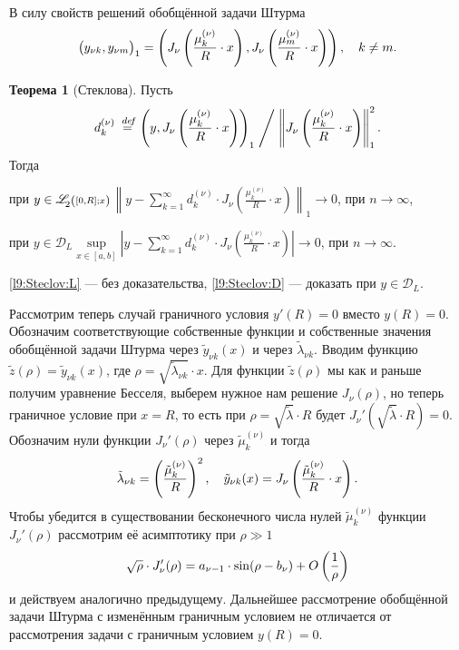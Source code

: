 \documentclass[12pt,a4paper,openany,fleqn]{book}
\newcommand {\defeq}{\stackrel{\hspace{0.09 cm}de\!f}{=}}
\newcommand {\eqdef}{\defeq}
\newcommand{\mc}[1]{\ensuremath{\mathcal{#1}}}
\newcommand{\norm}[1]{\ensuremath{\left\|#1\right\|}}
\newcommand{\fLr}[1][{[a,b];\rho}]{\ensuremath{\mathscr{L}\hspace*{-0.11 cm}{\mathstrut}_{2}{\scriptstyle\left(\vphantom{A^b}#1\right)}}}
\theoremstyle{definition}
\newtheorem{_teor}{Теорема}[section]
\begin{document}
	В силу свойств решений обобщённой задачи Штурма 
	\begin{equation*}
		\hfill\big(y_{\nu k},y_{\nu m}\big)_1=\left(J_{\nu}\left(\frac{\mu_{k}^{(\nu)}}{R}\cdot x\right),J_{\nu}\left(\frac{\mu_{m}^{(\nu)}}{R}\cdot x\right)\right),\quad k\neq m.\hfill
	\end{equation*}
	\begin{_teor}[Стеклова]
		Пусть
		\begin{equation*}
			\hfill d_k^{(\nu)}\eqdef\left(y,J_{\nu}\left(\frac{\mu_{k}^{(\nu)}}{R}\cdot x\right)\right)_1\Biggm/\norm{J_{\nu}\left(\frac{\mu_{k}^{(\nu)}}{R}\cdot x\right)}_1^2.\hfill
		\end{equation*} 
		Тогда 
		\begin{enumerateP1}
			\item\label{l9:Steclov:L}при $y\in\fLr[{[0,R];x}]$\quad $\displaystyle\norm{y-\sum\limits_{k=1}^{\infty}d_k^{(\nu)}\cdot J_{\nu}\left(\frac{\mu_{k}^{(\nu)}}{R}\cdot x\right)}_1\to0$, при $n\to\infty$,
			\item\label{l9:Steclov:D}при $y\in\mc{D}_L$\quad$\displaystyle\sup\limits_{x\in[a,b]}\left|y-\sum\limits_{k=1}^{\infty}d_k^{(\nu)}\cdot J_{\nu}\left(\frac{\mu_{k}^{(\nu)}}{R}\cdot x\right)\right|\to0$, при $n\to\infty$. 
		\end{enumerateP1} 
	\end{_teor}
	\noindent\ref{l9:Steclov:L} --- без доказательства, \ref{l9:Steclov:D} --- доказать при $y\in\mc{D}_L$. 
	
	Рассмотрим теперь случай граничного условия $y'(R)=0$ вместо $y(R)=0$. Обозначим соответствующие собственные функции и собственные значения обобщённой задачи Штурма через $\tilde{y}_{\nu k}(x)$ и через $\tilde{\lambda}_{\nu k}$. Вводим функцию $\tilde{z}(\rho)=\tilde{y}_{\nu k}(x)$, где $\rho=\sqrt{\tilde{\lambda}_{\nu k}}\cdot x$. Для функции $\tilde{z}(\rho)$ мы как и раньше получим уравнение Бесселя, выберем нужное нам решение $J_{\nu}(\rho)$, но теперь граничное условие при $x=R$, то есть при $\rho=\sqrt{\tilde{\lambda}}\cdot R$ будет $J_{\nu}'\left(\sqrt{\tilde{\lambda}}\cdot R\right)=0$. Обозначим нули функции $J_{\nu}'(\rho)$ через $\tilde{\mu}_k^{(\nu)}$ и тогда 
	\begin{equation*}
		\hfill\tilde{\lambda}_{\nu k}=\left(\frac{\tilde{\mu}_k^{(\nu)}}{R}\right)^2,\quad \tilde{y}_{\nu k}(x)=J_{\nu}\left(\frac{\tilde{\mu}_k^{(\nu)}}{R}\cdot x\right).\hfill
	\end{equation*}
	Чтобы убедится в существовании бесконечного числа нулей $\tilde{\mu}_k^{(\nu)}$ функции $J_{\nu}'(\rho)$ рассмотрим её асимптотику при $\rho\gg1$
	\begin{equation*}
		\hfill\sqrt{\rho}\cdot J_{\nu}'(\rho)=a_{\nu-1}\cdot\sin(\rho-b_{\nu})+O\left(\frac{1}{\rho}\right)\hfill
	\end{equation*}
	и действуем аналогично предыдущему. Дальнейшее рассмотрение обобщённой задачи Штурма с изменённым граничным условием не отличается от рассмотрения задачи с граничным условием $y(R)=0$.
	
\end{document}
